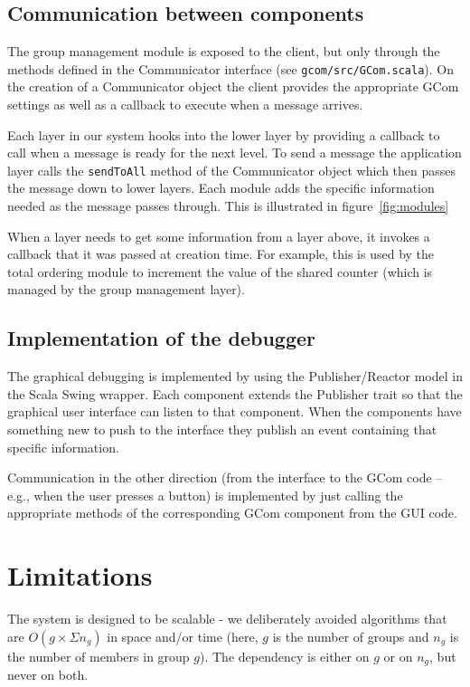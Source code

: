 \documentclass[10pt, oneside]{article}
\begin{document}
\subsection{Communication between components}

The group management module is exposed to the client, but only through the
methods defined in the Communicator interface (see
\texttt{gcom/src/GCom.scala}). On the creation of a Communicator object the
client provides the appropriate GCom settings as well as a callback to execute
when a message arrives.

Each layer in our system hooks into the lower layer by providing a callback to
call when a message is ready for the next level. To send a message the
application layer calls the \texttt{sendToAll} method of the Communicator object
which then passes the message down to lower layers. Each module adds the
specific information needed as the message passes through. This is illustrated
in figure~\ref{fig:modules}

When a layer needs to get some information from a layer above, it invokes a
callback that it was passed at creation time. For example, this is used by the
total ordering module to increment the value of the shared counter (which is
managed by the group management layer).

\subsection{Implementation of the debugger}

The graphical debugging is implemented by using the Publisher/Reactor model in
the Scala Swing wrapper. Each component extends the Publisher trait so that the
graphical user interface can listen to that component. When the components have
something new to push to the interface they publish an event containing that
specific information.

Communication in the other direction (from the interface to the GCom code --
e.g., when the user presses a button) is implemented by just calling the
appropriate methods of the corresponding GCom component from the GUI code.

\section{Limitations}

The system is designed to be scalable - we deliberately avoided algorithms that
are $O(g \times \Sigma n_g)$ in space and/or time (here, $g$ is the number of
groups and $n_g$ is the number of members in group $g$). The dependency is
either on $g$ or on $n_g$, but never on both.
\end{document}
